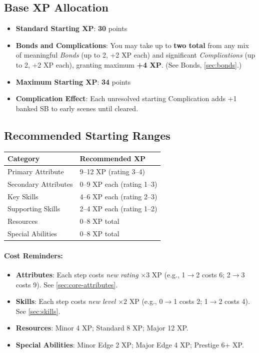 \subsection*{Base XP Allocation}
\begin{itemize}
\item \textbf{Standard Starting XP}: \textbf{30} points
\item \textbf{Bonds and Complications}: You may take up to \textbf{two total} from any mix of meaningful \emph{Bonds} (up to 2, +2 XP each) and significant \emph{Complications} (up to 2, +2 XP each), granting maximum \textbf{+4 XP}. (See Bonds, \ref{sec:bonds}.)
\item \textbf{Maximum Starting XP}: \textbf{34} points
\item \textbf{Complication Effect}: Each unresolved starting Complication adds +1 banked SB to early scenes until cleared.
\end{itemize}

\subsection*{Recommended Starting Ranges}

\begin{center}
\small
\begin{longtable}{ll}
\toprule
\textbf{Category} & \textbf{Recommended XP} \\
\midrule
Primary Attribute & 9--12 XP (rating 3--4) \\
Secondary Attributes & 0--9 XP each (rating 1--3) \\
Key Skills & 4--6 XP each (rating 2--3) \\
Supporting Skills & 2--4 XP each (rating 1--2) \\
Resources & 0--8 XP total \\
Special Abilities & 0--8 XP total \\
\bottomrule
\end{longtable}
\end{center}

\paragraph{Cost Reminders:}
\begin{itemize}
\item \textbf{Attributes}: Each step costs \emph{new rating} $\times 3$ XP (e.g., 1$\to$2 costs 6; 2$\to$3 costs 9). See \ref{sec:core-attributes}.
\item \textbf{Skills}: Each step costs \emph{new level} $\times 2$ XP (e.g., 0$\to$1 costs 2; 1$\to$2 costs 4). See \ref{sec:skills}.
\item \textbf{Resources}: Minor 4 XP; Standard 8 XP; Major 12 XP.
\item \textbf{Special Abilities}: Minor Edge 2 XP; Major Edge 4 XP; Prestige 6+ XP.
\end{itemize}

